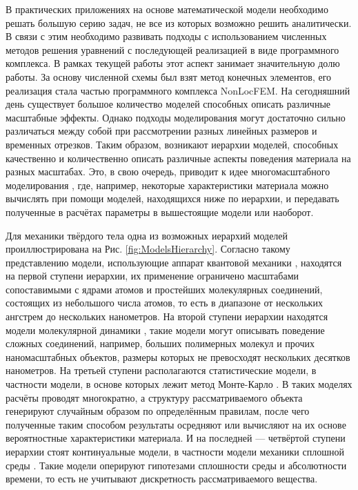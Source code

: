 \ifsynopsis
В практических приложениях на основе математической модели необходимо решать большую серию задач, не все из которых возможно решить аналитически. В связи с этим необходимо развивать подходы с использованием численных методов решения уравнений с последующей реализацией в виде программного комплекса. В рамках текущей работы этот аспект занимает значительную долю работы. За основу численной схемы был взят метод конечных элементов, его реализация стала частью программного комплекса NonLocFEM.
\nocite{AMCSM2019}
		\nocite{ZAMM}
		\nocite{NonlocalSaintVenant}
		\nocite{NonlocalRadiation}
\else
На сегодняшний день существует большое количество моделей способных описать различные масштабные эффекты. Однако подходы моделирования могут достаточно сильно различаться между собой при рассмотрении разных линейных размеров и временных отрезков. Таким образом, возникают иерархии моделей, способных качественно и количественно описать различные аспекты поведения материала на разных масштабах. Это, в свою очередь, приводит к идее многомасштабного моделирования \cite{Multiscale1}, где, например, некоторые характеристики материала можно вычислять при помощи моделей, находящихся ниже по иерархии, и передавать полученные в расчётах параметры в вышестоящие модели или наоборот.
\fi

\ifsynopsis
\else
Для механики твёрдого тела одна из возможных иерархий моделей проиллюстрирована на Рис. \ref{fig:ModelsHierarchy}. Согласно такому представлению модели, использующие аппарат квантовой механики \cite{QuantumModelling1, QuantumModelling2}, находятся на первой ступени иерархии, их применение ограничено масштабами сопоставимыми с ядрами атомов и простейших молекулярных соединений, состоящих из небольшого числа атомов, то есть в диапазоне от нескольких ангстрем до нескольких нанометров. На второй ступени иерархии находятся модели молекулярной динамики \cite{MD1, MD2, MD3, MD4}, такие модели могут описывать поведение сложных соединений, например, больших полимерных молекул и прочих наномасштабных объектов, размеры которых не превосходят нескольких десятков нанометров. На третьей ступени располагаются статистические модели, в частности модели, в основе которых лежит метод Монте-Карло \cite{MonteCarlo1, MonteCarlo2}. В таких моделях расчёты проводят многократно, а структуру рассматриваемого объекта генерируют случайным образом по определённым правилам, после чего полученные таким способом результаты осредняют или вычисляют на их основе вероятностные характеристики материала. И на последней --- четвёртой ступени иерархии стоят континуальные модели, в частности модели механики сплошной среды \cite{MSS}. Такие модели оперируют гипотезами сплошности среды и абсолютности времени, то есть не учитывают дискретность рассматриваемого вещества.
\fi

